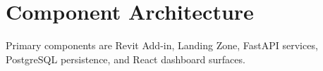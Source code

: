 \section{Component Architecture}
Primary components are Revit Add-in, Landing Zone, FastAPI services, PostgreSQL persistence, and React dashboard surfaces.

